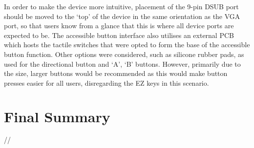 In order to make the device more intuitive, placement of the 9-pin DSUB port should be moved to the ‘top’ of the device in the same orientation as the VGA port, so that users know from a glance that this is where all device ports are expected to be.
The accessible button interface also utilises an external PCB which hosts the tactile switches that were opted to form the base of the accessible button function. 
Other options were considered, such as silicone rubber pads, as used for the directional button and ‘A’, ‘B’ buttons. 
However, primarily due to the size, larger buttons would be recommended as this would make button presses easier for all users, disregarding the EZ keys in this scenario.


\section{Final Summary}
//